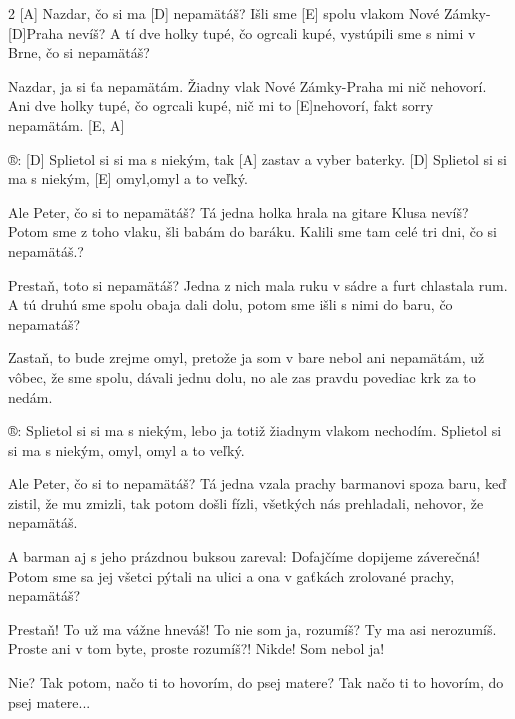 
\begin{multicols}{2}
[A] Nazdar, čo si ma [D] nepamätáš?
Išli sme [E] spolu vlakom Nové Zámky- [D]Praha nevíš?
A tí dve holky tupé, čo ogrcali kupé, 
vystúpili sme s nimi v Brne, čo si nepamätáš?

Nazdar, ja si ťa nepamätám.
Žiadny vlak Nové Zámky-Praha mi nič nehovorí.
Ani dve holky tupé, čo ogrcali kupé, 
nič mi to [E]nehovorí, fakt sorry nepamätám. [E, A]

®: [D] Splietol si si ma s niekým, tak [A] zastav a vyber baterky.
[D] Splietol si si ma s niekým, [E] omyl,omyl a to veľký.


	Ale Peter, čo si to nepamätáš?
Tá jedna holka hrala na gitare Klusa nevíš?
Potom sme z toho vlaku, šli babám do baráku.
Kalili sme tam celé tri dni, čo si nepamätáš.?

Prestaň, toto si nepamätáš?
Jedna z nich mala ruku v sádre a furt chlastala rum.
A tú druhú sme spolu obaja dali dolu, 
potom sme išli s nimi do baru, čo nepamatáš?

Zastaň, to bude zrejme omyl, 
pretože ja som v bare nebol ani nepamätám, 
už vôbec, že sme spolu, dávali jednu dolu, 
no ale zas pravdu povediac krk za to nedám.

®: Splietol si si ma s niekým, 
lebo ja totiž žiadnym vlakom nechodím.
Splietol si si ma s niekým, omyl, omyl a to veľký.

Ale Peter, čo si to nepamätáš?
Tá jedna vzala prachy barmanovi spoza baru, 
keď zistil, že mu zmizli, tak potom došli fízli, 
všetkých nás prehladali, nehovor, že nepamätáš.

A barman aj s jeho prázdnou buksou
zareval: Dofajčíme dopijeme záverečná!
Potom sme sa jej všetci pýtali na ulici
a ona v gaťkách zrolované prachy, nepamätáš?

Prestaň! To už ma vážne hneváš!
To nie som ja, rozumíš? Ty ma asi nerozumíš.
Proste ani v tom byte, proste rozumíš?! Nikde!
Som nebol ja!

Nie? Tak potom, načo ti to hovorím, do psej matere?
Tak načo ti to hovorím, do psej matere...
\end{multicols}
